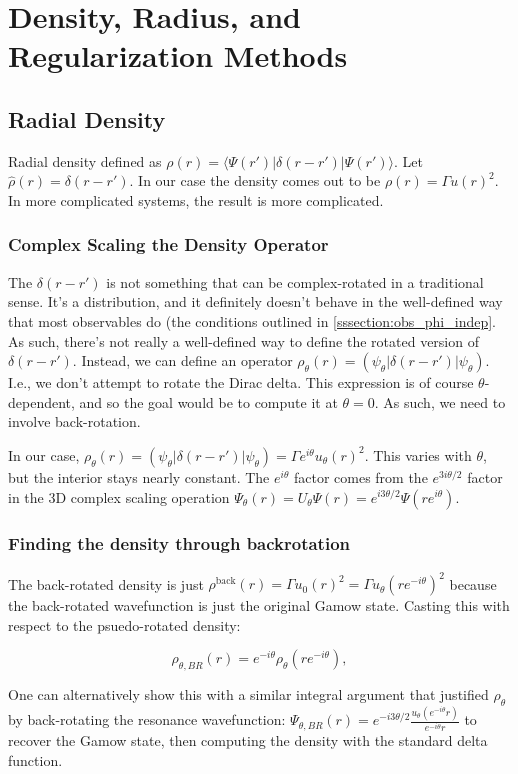 \section{Density, Radius, and Regularization Methods}
\subsection{Radial Density}
Radial density defined as $\rho(r) = \langle \Psi(r')| \delta(r - r') | \Psi(r')\rangle$. Let $\hat{\rho}(r) = \delta(r-r')$. In our case the density comes out to be $\rho(r)=\Gamma u(r)^2$. In more complicated systems, the result is more complicated. 

\subsubsection{Complex Scaling the Density Operator}
The $\delta(r - r')$ is not something that can be complex-rotated in a traditional sense. It's a distribution, and it definitely doesn't behave in the well-defined way that most observables do (the conditions outlined in \cref{sssection:obs_phi_indep}. As such, there's not really a well-defined way to define the rotated version of $\delta(r - r')$. Instead, we can define an operator $\rho_\theta(r) = (\psi_\theta|\delta(r-r')|\psi_\theta)$. I.e., we don't attempt to rotate the Dirac delta. This expression is of course $\theta$-dependent, and so the goal would be to compute it at $\theta=0$. As such, we need to involve back-rotation. 

In our case, $\rho_\theta(r) = (\psi_\theta|\delta(r-r')|\psi_\theta) =\Gamma e^{i\theta}u_\theta(r)^2$. This varies with $\theta$, but the interior stays nearly constant. The $e^{i\theta}$ factor comes from the $e^{3i\theta/2}$ factor in the 3D complex scaling operation $\Psi_\theta(r) = U_\theta\Psi(r) = e^{i3\theta/2}\Psi(re^{i\theta})$.
\subsubsection{Finding the density through backrotation}
The back-rotated density is just $\rho^{\text{back}}(r) = \Gamma u_0(r)^2 =  \Gamma u_\theta(re^{-i\theta})^2$ because the back-rotated wavefunction is just the original Gamow state. Casting this with respect to the psuedo-rotated density:

$$
\rho_{\theta, BR}(r) = e^{-i\theta} \rho_\theta(re^{-i\theta}),
$$

One can alternatively show this with a similar integral argument that justified $\rho_\theta$ by back-rotating the resonance wavefunction: $\Psi_{\theta,BR}(r) = e^{-i3\theta/2}\frac{u_\theta(e^{-i\theta}r)}{e^{-i\theta}r}$ to recover the Gamow state, then computing the density with the standard delta function.
